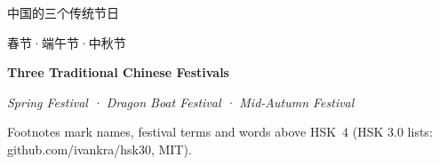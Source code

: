 \documentclass[twoside]{article}
\newcommand\bbzhhead{}\newcommand\bbenhd{}
\begin{document}
\thispagestyle{empty}
\begin{center}
\vspace*{30mm}
{\zhheadfont\fontsize{22pt}{30pt}\selectfont 中国的三个传统节日\par}\vspace{4mm}
{\zhfont\large 春节·端午节·中秋节\par}\vspace{10mm}
{\Large\bfseries Three Traditional Chinese Festivals\par}\vspace{3mm}
{\itshape Spring Festival · Dragon Boat Festival · Mid-Autumn Festival\par}
\vspace{12mm}{\small Text and translation by Claude (Anthropic) — a test text for zhbook\par}
\vfill
{\footnotesize\color{bbsoft}Footnotes mark names, festival terms and words above HSK~4 (HSK 3.0 lists: github.com/ivankra/hsk30, MIT).\par}
\end{center}
\clearpage
\renewcommand\bbzhhead{中国的三个传统节日}\renewcommand\bbenhd{Three Traditional Chinese Festivals}
\end{document}
